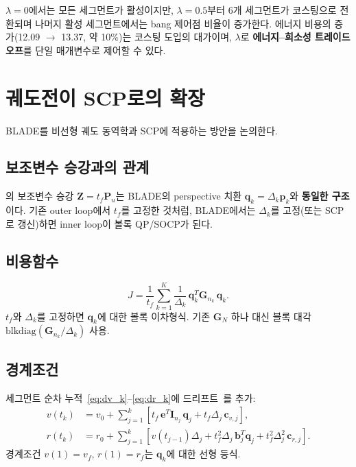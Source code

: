 \documentclass[11pt]{article}
\begin{document}
$\lambda = 0$에서는 모든 세그먼트가 활성이지만,
$\lambda = 0.5$부터 6개 세그먼트가 코스팅으로 전환되며
나머지 활성 세그먼트에서는 bang 제어점 비율이 증가한다.
에너지 비용의 증가(12.09 $\to$ 13.37, 약 10\%)는 코스팅 도입의 대가이며,
$\lambda$로 \textbf{에너지--희소성 트레이드오프}를 단일 매개변수로 제어할 수 있다.


\section{궤도전이 SCP로의 확장}
\label{sec:scp_extension}

BLADE를 비선형 궤도 동역학과 SCP에 적용하는 방안을 논의한다.

\subsection{보조변수 승강과의 관계}

\cite{report007}의 보조변수 승강 $\mathbf{Z} = t_f \mathbf{P}_u$는
BLADE의 perspective 치환 $\mathbf{q}_k = \Delta_k \mathbf{p}_k$와
\textbf{동일한 구조}이다.
기존 outer loop에서 $t_f$를 고정한 것처럼,
BLADE에서는 $\Delta_k$를 고정(또는 SCP로 갱신)하면
inner loop이 볼록 QP/SOCP가 된다.

\subsection{비용함수}

\begin{equation}
  J = \frac{1}{t_f} \sum_{k=1}^{K}
  \frac{1}{\Delta_k}\, \mathbf{q}_k^T \mathbf{G}_{n_k}\, \mathbf{q}_k.
\end{equation}
$t_f$와 $\Delta_k$를 고정하면 $\mathbf{q}_k$에 대한 볼록 이차형식.
기존 $\mathbf{G}_N$ 하나 대신 블록 대각 $\mathrm{blkdiag}(\mathbf{G}_{n_k}/\Delta_k)$ 사용.

\subsection{경계조건}

세그먼트 순차 누적~\eqref{eq:dv_k}--\eqref{eq:dr_k}에 드리프트~\cite{report009}를 추가:
\begin{align}
  v(t_k) &= v_0 + \sum_{j=1}^{k} \left[
    t_f\, \mathbf{e}^T \mathbf{I}_{n_j}\, \mathbf{q}_j + t_f \Delta_j\, \mathbf{c}_{v,j}
  \right], \\
  r(t_k) &= r_0 + \sum_{j=1}^{k} \left[
    v(t_{j-1}) \Delta_j + t_f^2 \Delta_j\, \mathbf{b}_j^T \mathbf{q}_j
    + t_f^2 \Delta_j^2\, \mathbf{c}_{r,j}
  \right].
\end{align}
경계조건 $v(1) = v_f$, $r(1) = r_f$는 $\mathbf{q}_k$에 대한 선형 등식.
\end{document}
